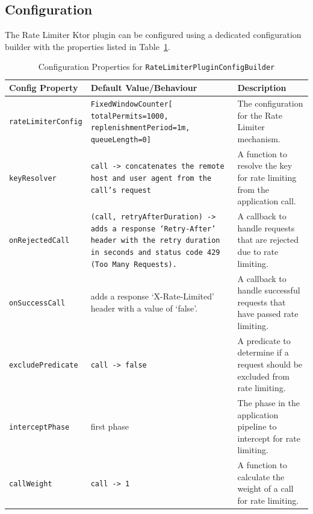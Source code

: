 \subsection{Configuration}\label{subsec:rate-limiter-configuration}

The Rate Limiter Ktor plugin can be configured using a dedicated configuration builder with the properties listed in Table~\ref{tab:rate-limiter-config-builder}.

\begin{table}[!htb]
    \centering
    \caption{Configuration Properties for \texttt{RateLimiterPluginConfigBuilder}}
    \label{tab:rate-limiter-config-builder}
    \vspace{0.3cm}
    \begin{tabular}{|l|p{5cm}|p{6cm}|}
        \hline
        \textbf{Config Property}   & \textbf{Default Value/Behaviour}                                                       & \textbf{Description}                                                         \\ \hline
        \texttt{rateLimiterConfig} & \texttt{FixedWindowCounter[ totalPermits=1000, replenishmentPeriod=1m, queueLength=0]} & The configuration for the Rate Limiter mechanism. \\ \hline
        \texttt{keyResolver}       & \texttt{call -> concatenates the remote host and user agent from the call's request} & A function to resolve the key for rate limiting from the application call. \\ \hline
        \texttt{onRejectedCall} & \texttt{(call, retryAfterDuration) -> adds a response `Retry-After'
        header with the retry duration in seconds and status code 429
            (Too Many Requests).} & A callback to handle requests that are rejected due to rate limiting. \\ \hline
        \texttt{onSuccessCall} & adds a response `X-Rate-Limited' header with a value of `false'.
        & A callback to handle successful requests that have passed rate limiting. \\ \hline
        \texttt{excludePredicate}  & \texttt{call -> false}                                                                 & A predicate to determine if a request should be excluded from rate limiting. \\ \hline
        \texttt{interceptPhase}    & first phase                                                                            & The phase in the application pipeline to intercept for rate limiting.        \\ \hline
        \texttt{callWeight}        & \texttt{call -> 1}                                                                     & A function to calculate the weight of a call for rate limiting.              \\ \hline
    \end{tabular}
\end{table}
